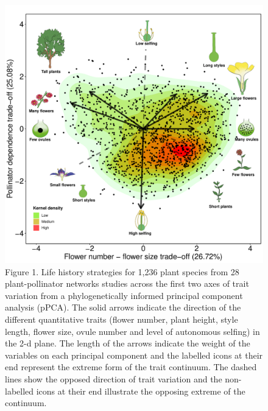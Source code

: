 \documentclass[12pt,a4paper,]{article}
\begin{document}
\begin{figure}
\centering
\includegraphics{output/figures/unnamed-chunk-1-1.pdf}
\caption{\label{fig:unnamed-chunk-1}Figure 1. Life history strategies for
1,236 plant species from 28 plant-pollinator networks studies across the
first two axes of trait variation from a phylogenetically informed
principal component analysis (pPCA). The solid arrows indicate the
direction of the different quantitative traits (flower number, plant
height, style length, flower size, ovule number and level of autonomous
selfing) in the 2-d plane. The length of the arrows indicate the weight
of the variables on each principal component and the labelled icons at
their end represent the extreme form of the trait continuum. The dashed
lines show the opposed direction of trait variation and the non-labelled
icons at their end illustrate the opposing extreme of the continuum.}
\end{figure}
\end{document}
